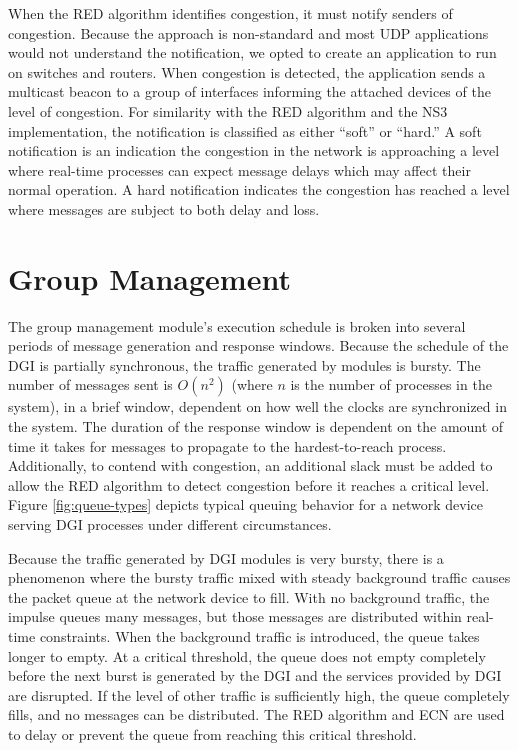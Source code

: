 When the \ac{RED} algorithm identifies congestion, it must notify senders of congestion.
Because the approach is non-standard and most UDP applications would not understand the notification, we opted to create an application to run on switches and routers.
When congestion is detected, the application sends a multicast beacon to a group of interfaces informing the attached devices of the level of congestion.
For similarity with the \ac{RED} algorithm and the \ac{NS3} implementation, the notification is classified as either ``soft'' or ``hard.''
A soft notification is an indication the congestion in the network is approaching a level where real-time processes can expect message delays which may affect their normal operation.
A hard notification indicates the congestion has reached a level where messages are subject to both delay and loss.

\section{Group Management}

The group management module's execution schedule is broken into several periods of message generation and response windows.
Because the schedule of the \ac{DGI} is partially synchronous, the traffic generated by modules is bursty.
The number of messages sent is $O(n^2)$ (where $n$ is the number of processes in the system), in a brief window, dependent on how well the clocks are synchronized in the system.
The duration of the response window is dependent on the amount of time it takes for messages to propagate to the hardest-to-reach process.
Additionally, to contend with congestion, an additional slack must be added to allow the \ac{RED} algorithm to detect congestion before it reaches a critical level.
Figure \ref{fig:queue-types} depicts typical queuing behavior for a network device serving \ac{DGI} processes under different circumstances.

Because the traffic generated by \ac{DGI} modules is very bursty, there is a phenomenon where the bursty traffic mixed with steady background traffic causes the packet queue at the network device to fill.
With no background traffic, the impulse queues many messages, but those messages are distributed within real-time constraints.
When the background traffic is introduced, the queue takes longer to empty.
At a critical threshold, the queue does not empty completely before the next burst is generated by the \ac{DGI} and the services provided by \ac{DGI} are disrupted.
If the level of other traffic is sufficiently high, the queue completely fills, and no messages can be distributed.
The \ac{RED} algorithm and \ac{ECN} are used to delay or prevent the queue from reaching this critical threshold.

